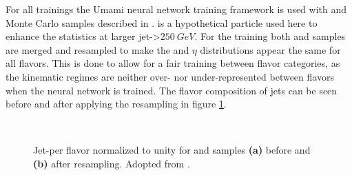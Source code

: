 For all trainings the Umami neural network training framework \citep{Froch:2857164} is used with \ttbar and \Zprime Monte Carlo samples described in \citep{ATL-PHYS-PUB-2017-013}. \Zprime is a hypothetical particle used here to enhance the statistics at larger jet-\pt>$\SI{250}{GeV}$. For the training both \ttbar and \Zprime samples are merged and resampled to make the \pt and $\eta$ distributions appear the same for all flavors. This is done to allow for a fair training between flavor categories, as the kinematic regimes are neither over- nor under-represented between flavors when the neural network is trained. The flavor composition of jets can be seen before and after applying the resampling in figure \ref{fig:resampling}.
\begin{figure} 
  \centering
      \\
\caption[]{Jet-\pt per flavor normalized to unity for \ttbar and \Zprime samples \textbf{(a)} before and \textbf{(b)} after resampling. Adopted from \citep{umamiDocs}.}
\label{fig:resampling}    
\end{figure}




